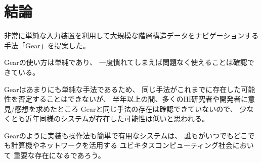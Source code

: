\documentclass[twoside]{wiss}
\def\GEAR{\textsf{Gear}}
\begin{document}

\section{結論}

非常に単純な入力装置を利用して大規模な階層構造データをナビゲーションする
手法「{\GEAR}」を提案した。

{\GEAR}の使い方は単純であり、
一度慣れてしまえば問題なく使えることは確認できている。

{\GEAR}はあまりにも単純な手法であるため、
同じ手法がこれまでに存在した可能性を否定することはできないが、
半年以上の間、多くのHI研究者や開発者に意見/感想を求めたところ
{\GEAR}と同じ手法の存在は確認できていないので、
少なくとも近年同様のシステムが存在した可能性は低いと思われる。

{\GEAR}のように実装も操作法も簡単で有用なシステムは、
誰もがいつでもどこでも計算機やネットワークを活用する
ユビキタスコンピューティング社会において
重要な存在になるであろう。

{\scriptsize


}
\end{document}
